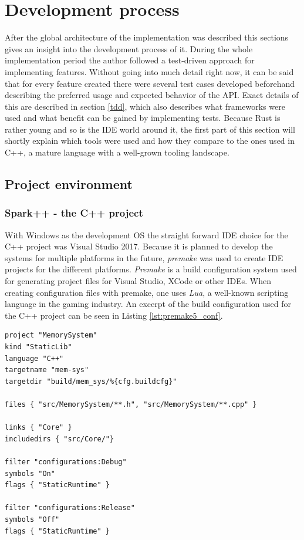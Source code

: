 \section{Development process}

After the global architecture of the implementation was described this sections gives an insight into the development process of it. During the whole implementation period the author followed a test-driven approach for implementing features. Without going into much detail right now, it can be said that for every feature created there were several test cases developed beforehand describing the preferred usage and expected behavior of the \ac{API}. Exact details of this are described in section \ref{tdd}, which also describes what frameworks were used and what benefit can be gained by implementing tests. Because Rust is rather young and so is the \ac{IDE} world around it, the first part of this section will shortly explain which tools were used and how they compare to the ones used in C++, a mature language with a well-grown tooling landscape.

\subsection{Project environment}


\subsubsection{Spark++ - the C++ project}

With Windows as the development \ac{OS} the straight forward \ac{IDE} choice for the C++ project was Visual Studio 2017. Because it is planned to develop the systems for multiple platforms in the future, \textit{premake} was used to create \ac{IDE} projects for the different platforms. \textit{Premake} is a build configuration system used for generating project files for Visual Studio, XCode or other \acp{IDE}. When creating configuration files with premake, one uses \textit{Lua}, a well-known scripting language in the gaming industry. An excerpt of the build configuration used for the C++ project can be seen in Listing \ref{lst:premake5_conf}.\\

\begin{lstlisting}[caption={Part of the premake.lua file used to generate the Spark C++ project files}, label={lst:premake5_conf}, language={[5.0]Lua}]
project "MemorySystem"
kind "StaticLib"
language "C++"
targetname "mem-sys"
targetdir "build/mem_sys/%{cfg.buildcfg}"

files { "src/MemorySystem/**.h", "src/MemorySystem/**.cpp" }

links { "Core" }
includedirs { "src/Core/"}

filter "configurations:Debug"
symbols "On"
flags { "StaticRuntime" }

filter "configurations:Release"
symbols "Off"
flags { "StaticRuntime" }
\end{lstlisting}

